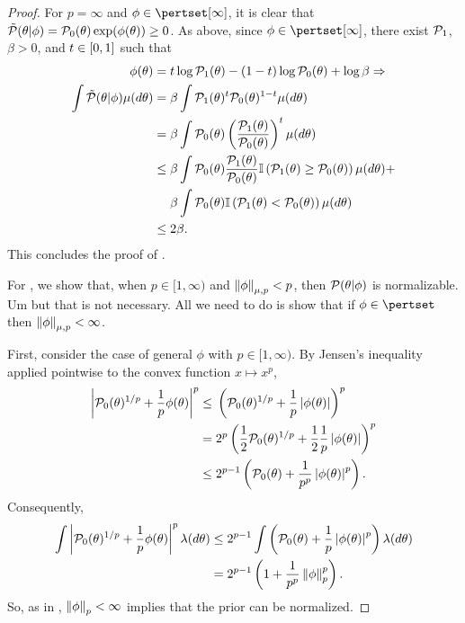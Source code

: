 \begin{proof}
For $p = \infty$ and $\phi \in \pertset[\infty]$, it is clear that $\tilde{\mathcal{P}}(\theta
\vert \phi) = \mathcal{P}_{0}(\theta) \exp(\phi(\theta)) \ge 0$. As above, since $\phi
\in \pertset[\infty]$, there exist $\mathcal{P}_{1}$, $\beta > 0$, and $t \in [0,1]$ such
that
%
\begin{align*}
%
\phi(\theta) ={}&
    \t \log \palt(\theta) - (1-\t)\log \pbase(\theta) + \log \beta \Rightarrow\\
%
\int \ptil(\theta \vert \phi)\mu(d\theta) ={}&
    \beta \int \palt(\theta)^\t \pbase(\theta)^{1 - \t}\mu(d\theta)
\\={}&
\beta \int \pbase(\theta)
    \left( \frac{\palt(\theta)}{\pbase(\theta)}\right)^\t \mu(d\theta)
\\\le{}&
\beta \int \pbase(\theta)
    \frac{\palt(\theta)}{\pbase(\theta)}
    \ind{\palt(\theta) \ge \pbase(\theta)} \mu(d\theta) +
\\&
  \beta \int \pbase(\theta)
    \ind{\palt(\theta) < \pbase(\theta)} \mu(d\theta)
\\\le{}& 2\beta.
%
\end{align*}
%
This concludes the proof of .

For , we show that, when $p \in [1, \infty)$ and
$\left\Vert\phi\right\Vert_{\mu,p} < p$, then $\mathcal{P}(\theta \vert \phi)$ is normalizable. Um but
that is not necessary.  All we need to do is show that if $\phi \in \pertset$
then $\left\Vert\phi\right\Vert_{\mu,p} < \infty$.

First, consider the case of general $\phi$ with $p \in [1, \infty)$. By Jensen's
inequality applied pointwise to the convex function $x \mapsto x^p$,
%
\begin{align*}
%
\abs{\pbase(\theta)^{1/p} + \frac{1}{p}\phi(\theta) }^{p} \le{}&
    \left(\pbase(\theta)^{1/p} + \frac{1}{p}\abs{\phi(\theta)} \right)^{p}
\\={}&
    2^p \left(\frac{1}{2}\pbase(\theta)^{1/p} +
              \frac{1}{2} \frac{1}{p}\abs{\phi(\theta)} \right)^{p}
\\\le{}&
    2^{p-1} \left(\pbase(\theta) + \frac{1}{p^p}\abs{\phi(\theta)}^p \right).
%
\end{align*}
%
Consequently,
%
\begin{align*}
%
\int \abs{\pbase(\theta)^{1/p} + \frac{1}{p}\phi(\theta) }^{p}
    \lambda(d\theta) \le{}&
2^{p-1} \int \left(\pbase(\theta) + \frac{1}{p}\abs{\phi(\theta)}^p \right)
    \lambda(d\theta)
\\={}&
    2^{p-1} \left(1 + \frac{1}{p^p}\norm{\phi}_p^p\right).
%
\end{align*}
%
So, as in \citep[Result 2]{gustafson:1996:local}, $\left\Vert\phi\right\Vert_p < \infty$
implies that the prior can be normalized.


\end{proof}
